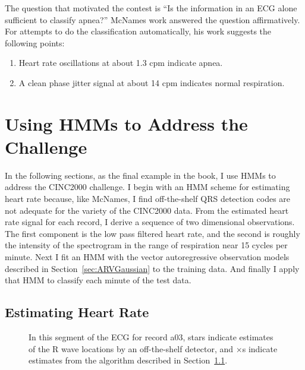 The question that motivated the contest is ``Is the information in an
ECG alone sufficient to classify apnea?'' McNames work answered the
question affirmatively.  For attempts to do the classification
automatically, his work suggests the following points:
\begin{enumerate}
\item Heart rate oscillations at about 1.3 cpm indicate apnea.
\item A clean phase jitter signal at about 14 cpm
  indicates normal respiration.
\end{enumerate}

\afterpage{\clearpage}%

\section{Using HMMs to Address the Challenge}
\label{sec:apnea_hmms}

In the following sections, as the final example in the book, I use
HMMs to address the CINC2000 challenge.  I begin with an HMM scheme
for estimating heart rate because, like McNames, I find off-the-shelf
QRS detection codes are not adequate for the variety of the CINC2000
data.  From the estimated heart rate signal for each record, I derive
a sequence of two dimensional observations.  The first component is
the low pass filtered heart rate, and the second is roughly the
intensity of the spectrogram in the range of respiration near 15
cycles per minute.  Next I fit an HMM with the vector autoregressive
observation models described in Section~\ref{sec:ARVGaussian} to the
training data.  And finally I apply that HMM to classify each minute
of the test data.

\subsection{Estimating Heart Rate}
\label{sec:ecg_hmms}

\begin{figure}
  \caption[Inadequate off-the-shelf ECG detectors]%
  {In this segment of the ECG for record a03, stars indicate estimates
    of the R wave locations by an off-the-shelf detector\cite{porr},
    and $\times$s indicate estimates from the algorithm described in
    Section~\ref{sec:ecg_hmms}. }
  \label{fig:elgendi}
\end{figure}


